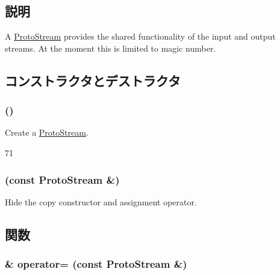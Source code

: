\subsection{説明}
A \hyperlink{classProtoStream}{ProtoStream} provides the shared functionality of the input and output streams. At the moment this is limited to magic number. 

\subsection{コンストラクタとデストラクタ}
\hypertarget{classProtoStream_ad731c8909fcb8114a4856bb8fe0f135e}{
\subsubsection[{ProtoStream}]{ ()}}
\label{classProtoStream_ad731c8909fcb8114a4856bb8fe0f135e}
Create a \hyperlink{classProtoStream}{ProtoStream}. 


\begin{DoxyCode}
71 {}
\end{DoxyCode}
\hypertarget{classProtoStream_a083fbbc25739ee13b2895a3db323a539}{
\subsubsection[{ProtoStream}]{ (const {\bf ProtoStream} \&)}}
\label{classProtoStream_a083fbbc25739ee13b2895a3db323a539}
Hide the copy constructor and assignment operator. 

\subsection{関数}
\hypertarget{classProtoStream_af18eb6f171e5994c12a349dcd5119b36}{
\subsubsection[{operator=}]{\& operator= (const {\bf ProtoStream} \&)}}
\label{classProtoStream_af18eb6f171e5994c12a349dcd5119b36}


